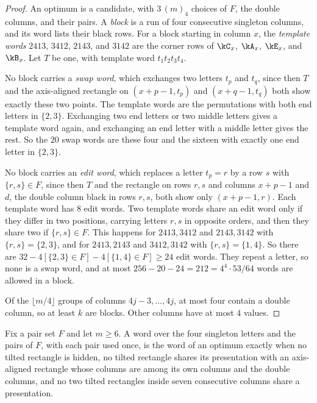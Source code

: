 \begin{proof}
An optimum is a candidate, with $3\,(m)_4$ choices of $F$, the double columns, and their
pairs. A \emph{block} is a run of four consecutive singleton columns, and its word lists
their black rows. For a block starting in column $x$, the \emph{template words} $2413$,
$3412$, $2143$, and $3142$ are the corner rows of $\kC_x$, $\kA_x$, $\kE_x$, and $\kB_x$. Let
$T$ be one, with template word $t_1t_2t_3t_4$.

No block carries a \emph{swap word}, which exchanges two letters $t_p$ and $t_q$, since then
$T$ and the axis-aligned rectangle on $(x+p-1,t_p)$ and $(x+q-1,t_q)$ both show exactly these
two points. The template words are the permutations with both end letters in $\{2,3\}$.
Exchanging two end letters or two middle letters gives a template word again, and exchanging
an end letter with a middle letter gives the rest. So the $20$ swap words are these four and
the sixteen with exactly one end letter in $\{2,3\}$.

No block carries an \emph{edit word}, which replaces a letter $t_p=r$ by a row $s$ with
$\{r,s\}\in F$, since then $T$ and the rectangle on rows $r,s$ and columns $x+p-1$ and $d$,
the double column black in rows $r,s$, both show only $(x+p-1,r)$. Each
template word has $8$ edit words. Two template words share an edit word only if they differ
in two positions, carrying letters $r,s$ in opposite orders, and then they share two if
$\{r,s\}\in F$. This happens for $2413,3412$ and $2143,3142$ with $\{r,s\}=\{2,3\}$, and for
$2413,2143$ and $3412,3142$ with $\{r,s\}=\{1,4\}$. So there
are
$32-4[\{2,3\}\in F]-4[\{1,4\}\in F]\ge24$ edit words. They repeat a letter, so none is a swap word, and at most
$256-20-24=212=4^4\cdot53/64$ words are allowed in a block.

Of the $\lfloor m/4\rfloor$ groups of columns $4j-3,\ldots,4j$, at most four contain a double
column, so at least $k$ are blocks. Other columns have at most $4$ values.
\end{proof}

\begin{lemma}\label{lem:fourmemory}
Fix a pair set $F$ and let $m\ge6$. A word over the four singleton letters and the pairs of $F$, with each pair used once, is the word of an optimum exactly when no tilted rectangle is hidden, no tilted rectangle shares its presentation with an axis-aligned rectangle whose columns are among its own columns and the double columns, and no two tilted rectangles inside seven consecutive columns share a presentation.
\end{lemma}

